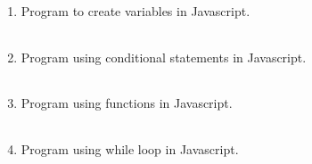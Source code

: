 \documentclass{exam}
\begin{document}
\begin{enumerate}
   \item  Program  to create variables in Javascript.

   \begin{myTableStyle}
   \begin{center} \begin{tabular}{ |m{14cm}| } \hline
              \\ \hline
    \end{tabular} \end{center}
\end{myTableStyle}
  \pagebreak

   \item  Program  using conditional statements in Javascript.

   \begin{myTableStyle}
   \begin{center} \begin{tabular}{ |m{14cm}| } \hline
              \\ \hline
    \end{tabular} \end{center}
\end{myTableStyle}
  \pagebreak

   \item  Program  using functions in Javascript.

   \begin{myTableStyle}
   \begin{center} \begin{tabular}{ |m{14cm}| } \hline
              \\ \hline
    \end{tabular} \end{center}
\end{myTableStyle}
  \pagebreak

   \item  Program  using while loop in Javascript.

   \begin{myTableStyle}
   \begin{center} \begin{tabular}{ |m{14cm}| } \hline
              \\ \hline
    \end{tabular} \end{center}
\end{myTableStyle}
  \pagebreak


\end{enumerate}
\end{document}
